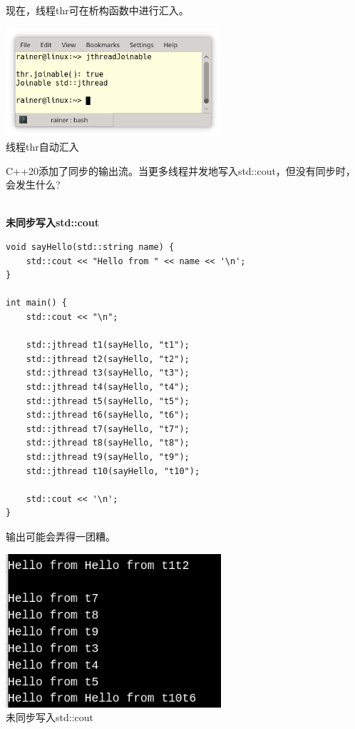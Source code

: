 现在，线程thr可在析构函数中进行汇入。

\begin{center}
\includegraphics[width=0.6\textwidth]{content/2/chapter3/images/10.png}\\
线程thr自动汇入
\end{center}


C++20添加了同步的输出流。当更多线程并发地写入std::cout，但没有同步时，会发生什么?

\hspace*{\fill} \\ %
\noindent
\textbf{未同步写入std::cout}
\begin{lstlisting}[style=styleCXX]
void sayHello(std::string name) {
	std::cout << "Hello from " << name << '\n';
}

int main() {
	std::cout << "\n";
	
	std::jthread t1(sayHello, "t1");
	std::jthread t2(sayHello, "t2");
	std::jthread t3(sayHello, "t3");
	std::jthread t4(sayHello, "t4");
	std::jthread t5(sayHello, "t5");
	std::jthread t6(sayHello, "t6");
	std::jthread t7(sayHello, "t7");
	std::jthread t8(sayHello, "t8");
	std::jthread t9(sayHello, "t9");
	std::jthread t10(sayHello, "t10");
	
	std::cout << '\n';
}
\end{lstlisting}

输出可能会弄得一团糟。

\begin{center}
\includegraphics[width=0.6\textwidth]{content/2/chapter3/images/11.png}\\
未同步写入std::cout
\end{center}

